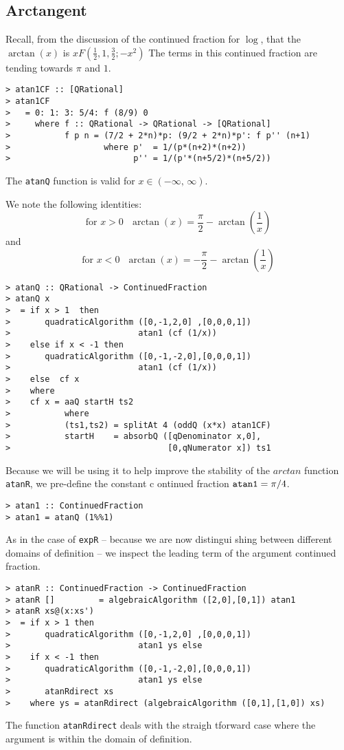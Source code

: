 \subsection{Arctangent}

Recall, from the discussion of the continued fraction for $\log$, that
the $\arctan(x)$ is $xF(\frac{1}{2},1,\frac{3}{2};-x^2)$ 
The terms in this continued fraction are tending towards $\pi$ and $1$.
\begin{verbatim}
> atan1CF :: [QRational]
> atan1CF
>   = 0: 1: 3: 5/4: f (8/9) 0
>     where f :: QRational -> QRational -> [QRational]
>           f p n = (7/2 + 2*n)*p: (9/2 + 2*n)*p': f p'' (n+1)
>                   where p'  = 1/(p*(n+2)*(n+2))
>                         p'' = 1/(p'*(n+5/2)*(n+5/2))
\end{verbatim}
%
The \mbox{\tt atanQ} function is valid for $x \in (-\infty,\,\infty)$.

We note the following identities:
\[\mbox{for $x>0$ } \arctan(x) = \frac{\pi}{2} -\arctan(\frac{1}{x})\]
and
\[\mbox{for $x<0$ } \arctan(x) = -\frac{\pi}{2} -\arctan(\frac{1}{x})\]

\begin{verbatim}
> atanQ :: QRational -> ContinuedFraction
> atanQ x
>  = if x > 1  then
>       quadraticAlgorithm ([0,-1,2,0] ,[0,0,0,1])
>                          atan1 (cf (1/x))
>    else if x < -1 then
>       quadraticAlgorithm ([0,-1,-2,0],[0,0,0,1])
>                          atan1 (cf (1/x))
>    else  cf x
>    where
>    cf x = aaQ startH ts2
>           where
>           (ts1,ts2) = splitAt 4 (oddQ (x*x) atan1CF)
>           startH    = absorbQ ([qDenominator x,0],
>                                [0,qNumerator x]) ts1
\end{verbatim}
%
%
Because we will be using it to help improve the stability of the
$arctan$ function \mbox{\tt atanR}, we pre-define the constant c
ontinued
fraction $\mbox{\tt atan1}\indexTT{atan1} = \pi/4$.
\begin{verbatim}
> atan1 :: ContinuedFraction
> atan1 = atanQ (1%%1)
\end{verbatim}
%
%
As in the case of \mbox{\tt expR} -- because we are now distingui
shing between
different domains of definition -- we inspect the leading term of the
argument continued fraction.
\begin{verbatim}
> atanR :: ContinuedFraction -> ContinuedFraction
> atanR []         = algebraicAlgorithm ([2,0],[0,1]) atan1
> atanR xs@(x:xs')
>  = if x > 1 then
>       quadraticAlgorithm ([0,-1,2,0] ,[0,0,0,1])
>                          atan1 ys else
>    if x < -1 then
>       quadraticAlgorithm ([0,-1,-2,0],[0,0,0,1])
>                          atan1 ys else
>       atanRdirect xs
>    where ys = atanRdirect (algebraicAlgorithm ([0,1],[1,0]) xs)
\end{verbatim}
%
%
%
The function \mbox{\tt atanRdirect} deals with the straigh
tforward case where
the argument is within the domain of definition.

